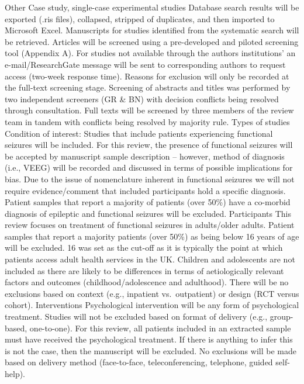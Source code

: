 \documentclass[
  12pt,
  openany]{book}
\begin{document}
Other Case study, single-case experimental studies
Database search results will be exported (.ris files), collapsed, stripped of duplicates, and then imported to Microsoft Excel. Manuscripts for studies identified from the systematic search will be retrieved. Articles will be screened using a pre-developed and piloted screening tool (Appendix A). For studies not available through the authors institutions' an e-mail/ResearchGate message will be sent to corresponding authors to request access (two-week response time). Reasons for exclusion will only be recorded at the full-text screening stage. Screening of abstracts and titles was performed by two independent screeners (GR \& BN) with decision conflicts being resolved through consultation. Full texts will be screened by three members of the review team in tandem with conflicts being resolved by majority rule.
Types of studies
Condition of interest:
Studies that include patients experiencing functional seizures will be included. For this review, the presence of functional seizures will be accepted by manuscript sample description -- however, method of diagnosis (i.e., VEEG) will be recorded and discussed in terms of possible implications for bias. Due to the issue of nomenclature inherent in functional seizures we will not require evidence/comment that included participants hold a specific diagnosis. Patient samples that report a majority of patients (over 50\%) have a co-morbid diagnosis of epileptic and functional seizures will be excluded.
Participants
This review focuses on treatment of functional seizures in adults/older adults. Patient samples that report a majority patients (over 50\%) as being below 16 years of age will be excluded. 16 was set as the cut-off as it is typically the point at which patients access adult health services in the UK. Children and adolescents are not included as there are likely to be differences in terms of aetiologically relevant factors and outcomes (childhood/adolescence and adulthood). There will be no exclusions based on context (e.g., inpatient vs.~outpatient) or design (RCT versus cohort).
Interventions
Psychological intervention will be any form of psychological treatment. Studies will not be excluded based on format of delivery (e.g., group-based, one-to-one). For this review, all patients included in an extracted sample must have received the psychological treatment. If there is anything to infer this is not the case, then the manuscript will be excluded. No exclusions will be made based on delivery method (face-to-face, teleconferencing, telephone, guided self-help).
\end{document}
